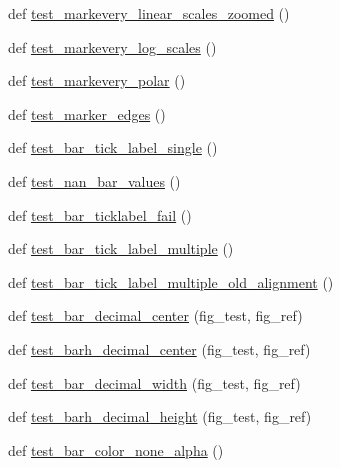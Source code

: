\begin{DoxyCompactItemize}
\item 
def \hyperlink{namespacematplotlib_1_1tests_1_1test__axes_abde7ed010f6bca7b7ac275dca3aa05d0}{test\+\_\+markevery\+\_\+linear\+\_\+scales\+\_\+zoomed} ()
\item 
def \hyperlink{namespacematplotlib_1_1tests_1_1test__axes_a7f79ed8e726e89a599052ed4406f460f}{test\+\_\+markevery\+\_\+log\+\_\+scales} ()
\item 
def \hyperlink{namespacematplotlib_1_1tests_1_1test__axes_a45a92036a57c6cd058f6bf737f7d2143}{test\+\_\+markevery\+\_\+polar} ()
\item 
def \hyperlink{namespacematplotlib_1_1tests_1_1test__axes_a263cf210e71395b138ce3916d1c93462}{test\+\_\+marker\+\_\+edges} ()
\item 
def \hyperlink{namespacematplotlib_1_1tests_1_1test__axes_ae919dfd20658bc2a4f9f14c2cc8db286}{test\+\_\+bar\+\_\+tick\+\_\+label\+\_\+single} ()
\item 
def \hyperlink{namespacematplotlib_1_1tests_1_1test__axes_a51546c1c200200e71d8847cf9cbed1a1}{test\+\_\+nan\+\_\+bar\+\_\+values} ()
\item 
def \hyperlink{namespacematplotlib_1_1tests_1_1test__axes_a1c4024eae8eae863f06c363c0478d44c}{test\+\_\+bar\+\_\+ticklabel\+\_\+fail} ()
\item 
def \hyperlink{namespacematplotlib_1_1tests_1_1test__axes_a58066ffd608b836183d9bfe010cadbfe}{test\+\_\+bar\+\_\+tick\+\_\+label\+\_\+multiple} ()
\item 
def \hyperlink{namespacematplotlib_1_1tests_1_1test__axes_a15fa1023f03d19fd5119de852293e561}{test\+\_\+bar\+\_\+tick\+\_\+label\+\_\+multiple\+\_\+old\+\_\+alignment} ()
\item 
def \hyperlink{namespacematplotlib_1_1tests_1_1test__axes_ab0309713042f5eb079cd98bc874bc2a1}{test\+\_\+bar\+\_\+decimal\+\_\+center} (fig\+\_\+test, fig\+\_\+ref)
\item 
def \hyperlink{namespacematplotlib_1_1tests_1_1test__axes_aab9da835781478697228bdd400258fdb}{test\+\_\+barh\+\_\+decimal\+\_\+center} (fig\+\_\+test, fig\+\_\+ref)
\item 
def \hyperlink{namespacematplotlib_1_1tests_1_1test__axes_a4c48cde78750679bfac5d04da56951ab}{test\+\_\+bar\+\_\+decimal\+\_\+width} (fig\+\_\+test, fig\+\_\+ref)
\item 
def \hyperlink{namespacematplotlib_1_1tests_1_1test__axes_a61ee93942db130b01ee5413db4de82d5}{test\+\_\+barh\+\_\+decimal\+\_\+height} (fig\+\_\+test, fig\+\_\+ref)
\item 
def \hyperlink{namespacematplotlib_1_1tests_1_1test__axes_aa6187ec50c18ef09d6b9bcc864fbcae6}{test\+\_\+bar\+\_\+color\+\_\+none\+\_\+alpha} ()

\end{DoxyCompactItemize}
